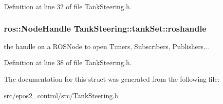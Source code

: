 Definition at line 32 of file Tank\-Steering.\-h.

\hypertarget{structTankSteering_1_1tankSet_a56100d71c75a60b1bee858cac36bd28b}{
\subsubsection[{roshandle}]{\setlength{\rightskip}{0pt plus 5cm}ros\-::\-Node\-Handle Tank\-Steering\-::tank\-Set\-::roshandle}}\label{structTankSteering_1_1tankSet_a56100d71c75a60b1bee858cac36bd28b}


the handle on a R\-O\-S\-Node to open Timers, Subscribers, Publishers... 



Definition at line 38 of file Tank\-Steering.\-h.



The documentation for this struct was generated from the following file\-:\begin{DoxyCompactItemize}
\item 
src/epos2\-\_\-control/src/Tank\-Steering.\-h\end{DoxyCompactItemize}
